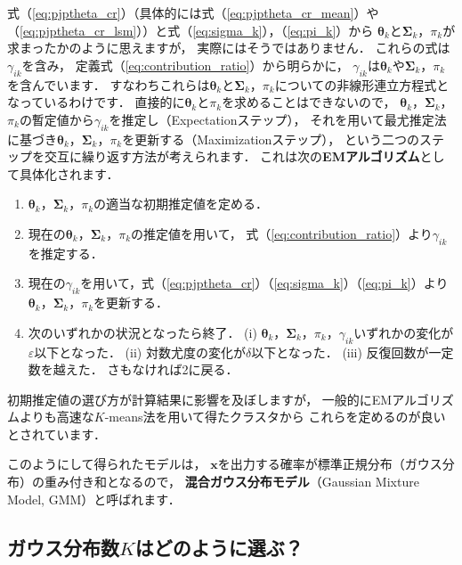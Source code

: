﻿\documentclass{jsarticle}
\begin{document}
式（\ref{eq:pjptheta_cr}）（具体的には式（\ref{eq:pjptheta_cr_mean}）や（\ref{eq:pjptheta_cr_lsm}））と式（\ref{eq:sigma_k}），（\ref{eq:pi_k}）から
$\bm{\theta}_{k}$と$\bm{\Sigma}_{k}$，$\pi_{k}$が求まったかのように思えますが，
実際にはそうではありません．
これらの式は$\gamma_{ik}$を含み，
定義式（\ref{eq:contribution_ratio}）から明らかに，
$\gamma_{ik}$は$\bm{\theta}_{k}$や$\bm{\Sigma}_{k}$，$\pi_{k}$を含んでいます．
すなわちこれらは$\bm{\theta}_{k}$と$\bm{\Sigma}_{k}$，$\pi_{k}$についての非線形連立方程式となっているわけです．
直接的に$\bm{\theta}_{k}$と$\pi_{k}$を求めることはできないので，
$\bm{\theta}_{k}$，$\bm{\Sigma}_{k}$，$\pi_{k}$の暫定値から$\gamma_{ik}$を推定し（Expectationステップ），
それを用いて最尤推定法に基づき$\bm{\theta}_{k}$，$\bm{\Sigma}_{k}$，$\pi_{k}$を更新する（Maximizationステップ），
という二つのステップを交互に繰り返す方法が考えられます．
これは次の{\bf EMアルゴリズム}\cite{bib:dempster1977}として具体化されます．
\begin{screen}
\begin{enumerate}
\setlength{\itemsep}{-.2\baselineskip}
\item{$\bm{\theta}_{k}$，$\bm{\Sigma}_{k}$，$\pi_{k}$の適当な初期推定値を定める．}
\item{現在の$\bm{\theta}_{k}$，$\bm{\Sigma}_{k}$，$\pi_{k}$の推定値を用いて，
式（\ref{eq:contribution_ratio}）より$\gamma_{ik}$を推定する．}
\item{現在の$\gamma_{ik}$を用いて，式（\ref{eq:pjptheta_cr}）（\ref{eq:sigma_k}）（\ref{eq:pi_k}）より$\bm{\theta}_{k}$，$\bm{\Sigma}_{k}$，$\pi_{k}$を更新する．}
\item{次のいずれかの状況となったら終了．
(i) $\bm{\theta}_{k}$，$\bm{\Sigma}_{k}$，$\pi_{k}$，$\gamma_{ik}$いずれかの変化が$\varepsilon$以下となった．
(ii) 対数尤度の変化が$\delta$以下となった．
(iii) 反復回数が一定数を越えた．
さもなければ2に戻る．}
\end{enumerate}
\end{screen}
初期推定値の選び方が計算結果に影響を及ぼしますが，
一般的にEMアルゴリズムよりも高速な$K$-means法を用いて得たクラスタから
これらを定めるのが良いとされています．

このようにして得られたモデルは，
$\bm{x}$を出力する確率が標準正規分布（ガウス分布）の重み付き和となるので，
{\bf 混合ガウス分布モデル}（Gaussian Mixture Model, GMM）と呼ばれます．

\subsection{ガウス分布数$K$はどのように選ぶ？}
\end{document}
